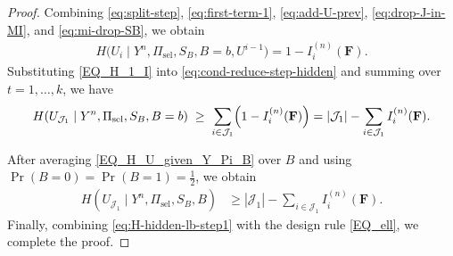 \documentclass[onecolumn]{IEEEtran} %
\newcommand{\1}{\mathbbm{1}}
\theoremstyle{boldremark}
\begin{document}
\begin{proof}
Combining \eqref{eq:split-step}, \eqref{eq:first-term-1}, \eqref{eq:add-U-prev}, \eqref{eq:drop-J-in-MI}, and \eqref{eq:mi-drop-SB}, we obtain
\begin{align}\label{EQ_H_1_I}
H\!\bigl(U_i\mid Y^n,\Pi_{\mathrm{sel}},S_B,B=b,U^{i-1}\bigr)=1-I_i^{(n)}(\mathbf F).
\end{align}
Substituting \eqref{EQ_H_1_I} into \eqref{eq:cond-reduce-step-hidden} and summing over
$t=1,\dots,k$, we have
\begin{align}\label{EQ_H_U_given_Y_Pi_B}
H(U_{\mathcal J_1}\mid Y^n,\Pi_{\mathrm{sel}},S_B,B=b)\;\ge\;
\sum_{i\in\mathcal J_1}\Bigl(1-I_i^{(n)}(\mathbf F)\Bigr)
=
|\mathcal J_1|-\sum_{i\in\mathcal J_1} I_i^{(n)}(\mathbf F).
\end{align}

After averaging \eqref{EQ_H_U_given_Y_Pi_B} over $B$ and using $\Pr(B=0)=\Pr(B=1)=\tfrac12$, we obtain
\begin{align}
H(U_{\mathcal J_1}\mid Y^n,\Pi_{\mathrm{sel}},S_B,B)
&\ge |\mathcal J_1|-\sum_{i\in\mathcal J_1} I_i^{(n)}(\mathbf F).\label{eq:H-hidden-lb-step1}
\end{align}
Finally, combining \eqref{eq:H-hidden-lb-step1} with the design rule \eqref{EQ_ell}, we complete the proof.
\end{proof}
\end{document}
